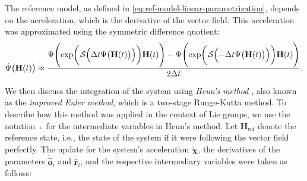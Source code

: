 The reference model, as defined in \eqref{eq:ref-model-linear-parametrization}, depends on the acceleration, which is the derivative of the vector field. This acceleration was approximated using the symmetric difference quotient: 
\begin{align}
    \dot{\Psi}\bigl(\mathbf{H}(t)\bigr) \approx \frac{\Psi\Biggl(\exp\biggl(\SL\Bigl(\Delta t\Psi\bigl(\mathbf{H}(t)\bigr)\Bigr)\biggr)\mathbf{H}(t)\Biggr) - \Psi\Biggl(\exp\biggl(\SL\Bigl(-\Delta t\Psi\bigl(\mathbf{H}(t)\bigr)\Bigr)\biggr)\mathbf{H}(t)\Biggr)}{2\Delta t}. \label{eq:approximation-derivative-psi}
\end{align}

We then discuss the integration of the system using \emph{Heun's method} \citep[p. 330]{fred2007algoritmos}, also known as the \emph{improved Euler method}, which is a two-stage Runge-Kutta method. To describe how this method was applied in the context of Lie groups, we use the notation $\underline{\cdot}$ for the intermediate variables in Heun's method. Let $\mathbf{H}_\text{ref}$ denote the reference state, i.e., the state of the system if it were following the vector field perfectly. The update for the system's acceleration $\ddot{\boldsymbol{\chi}}$, the derivatives of the parameters $\dot{\widehat{\mathbf{o}}}_i$ and $\dot{\widehat{\mathbf{r}}}_i$, and the respective intermediary variables were taken as follows:
